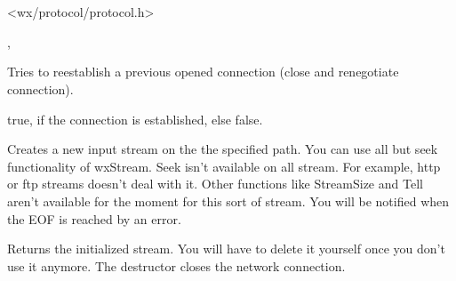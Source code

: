 \section{}\label{wxprotocol}




<wx/protocol/protocol.h>


, 



\label{wxprotoreconnect}


Tries to reestablish a previous opened connection (close and renegotiate connection).


true, if the connection is established, else false.

\label{wxprotogetinput}


Creates a new input stream on the the specified path. You can use all but seek
functionality of wxStream. Seek isn't available on all stream. For example,
http or ftp streams doesn't deal with it. Other functions like StreamSize and
Tell aren't available for the moment for this sort of stream.
You will be notified when the EOF is reached by an error.


Returns the initialized stream. You will have to delete it yourself once you
don't use it anymore. The destructor closes the network connection.



\label{wxprotoabort}

